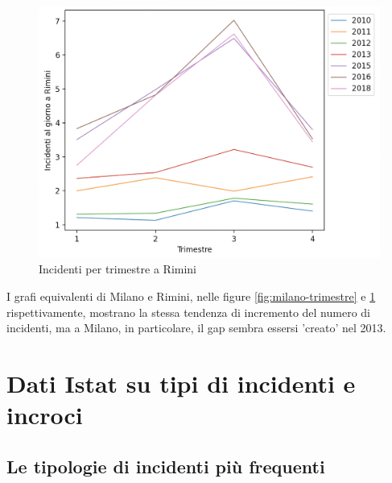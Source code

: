 \documentclass[a4paper]{report}
\begin{document}
\begin{figure}
    \includegraphics[width=\linewidth]{../src/incidenti/incidenti_senza_coords/mese_incidenti/rimini_trimestre.png}
    \caption{Incidenti per trimestre a Rimini}
    \label{fig:rimini-trimestre}
\end{figure}

I grafi equivalenti di Milano e Rimini, nelle figure 
\ref{fig:milano-trimestre} e \ref{fig:rimini-trimestre} rispettivamente, 
mostrano la stessa tendenza di incremento del numero 
di incidenti, ma a Milano, in particolare, il gap sembra essersi 'creato' nel 2013.


\section{Dati Istat su tipi di incidenti e incroci}

\subsection{Le tipologie di incidenti più frequenti}
\end{document}
